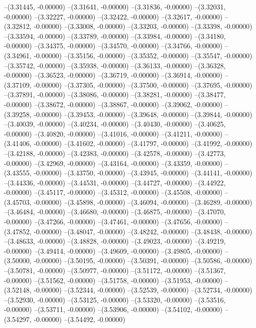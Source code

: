 --(3.31445, -0.00000)
--(3.31641, -0.00000)
--(3.31836, -0.00000)
--(3.32031, -0.00000)
--(3.32227, -0.00000)
--(3.32422, -0.00000)
--(3.32617, -0.00000)
--(3.32812, -0.00000)
--(3.33008, -0.00000)
--(3.33203, -0.00000)
--(3.33398, -0.00000)
--(3.33594, -0.00000)
--(3.33789, -0.00000)
--(3.33984, -0.00000)
--(3.34180, -0.00000)
--(3.34375, -0.00000)
--(3.34570, -0.00000)
--(3.34766, -0.00000)
--(3.34961, -0.00000)
--(3.35156, -0.00000)
--(3.35352, -0.00000)
--(3.35547, -0.00000)
--(3.35742, -0.00000)
--(3.35938, -0.00000)
--(3.36133, -0.00000)
--(3.36328, -0.00000)
--(3.36523, -0.00000)
--(3.36719, -0.00000)
--(3.36914, -0.00000)
--(3.37109, -0.00000)
--(3.37305, -0.00000)
--(3.37500, -0.00000)
--(3.37695, -0.00000)
--(3.37891, -0.00000)
--(3.38086, -0.00000)
--(3.38281, -0.00000)
--(3.38477, -0.00000)
--(3.38672, -0.00000)
--(3.38867, -0.00000)
--(3.39062, -0.00000)
--(3.39258, -0.00000)
--(3.39453, -0.00000)
--(3.39648, -0.00000)
--(3.39844, -0.00000)
--(3.40039, -0.00000)
--(3.40234, -0.00000)
--(3.40430, -0.00000)
--(3.40625, -0.00000)
--(3.40820, -0.00000)
--(3.41016, -0.00000)
--(3.41211, -0.00000)
--(3.41406, -0.00000)
--(3.41602, -0.00000)
--(3.41797, -0.00000)
--(3.41992, -0.00000)
--(3.42188, -0.00000)
--(3.42383, -0.00000)
--(3.42578, -0.00000)
--(3.42773, -0.00000)
--(3.42969, -0.00000)
--(3.43164, -0.00000)
--(3.43359, -0.00000)
--(3.43555, -0.00000)
--(3.43750, -0.00000)
--(3.43945, -0.00000)
--(3.44141, -0.00000)
--(3.44336, -0.00000)
--(3.44531, -0.00000)
--(3.44727, -0.00000)
--(3.44922, -0.00000)
--(3.45117, -0.00000)
--(3.45312, -0.00000)
--(3.45508, -0.00000)
--(3.45703, -0.00000)
--(3.45898, -0.00000)
--(3.46094, -0.00000)
--(3.46289, -0.00000)
--(3.46484, -0.00000)
--(3.46680, -0.00000)
--(3.46875, -0.00000)
--(3.47070, -0.00000)
--(3.47266, -0.00000)
--(3.47461, -0.00000)
--(3.47656, -0.00000)
--(3.47852, -0.00000)
--(3.48047, -0.00000)
--(3.48242, -0.00000)
--(3.48438, -0.00000)
--(3.48633, -0.00000)
--(3.48828, -0.00000)
--(3.49023, -0.00000)
--(3.49219, -0.00000)
--(3.49414, -0.00000)
--(3.49609, -0.00000)
--(3.49805, -0.00000)
--(3.50000, -0.00000)
--(3.50195, -0.00000)
--(3.50391, -0.00000)
--(3.50586, -0.00000)
--(3.50781, -0.00000)
--(3.50977, -0.00000)
--(3.51172, -0.00000)
--(3.51367, -0.00000)
--(3.51562, -0.00000)
--(3.51758, -0.00000)
--(3.51953, -0.00000)
--(3.52148, -0.00000)
--(3.52344, -0.00000)
--(3.52539, -0.00000)
--(3.52734, -0.00000)
--(3.52930, -0.00000)
--(3.53125, -0.00000)
--(3.53320, -0.00000)
--(3.53516, -0.00000)
--(3.53711, -0.00000)
--(3.53906, -0.00000)
--(3.54102, -0.00000)
--(3.54297, -0.00000)
--(3.54492, -0.00000)
